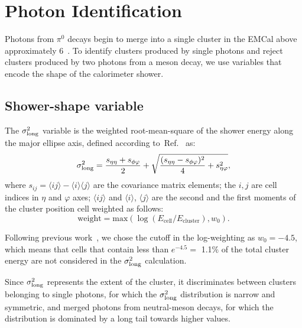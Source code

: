 
\section{Photon Identification}
\label{sec:photonID}
Photons from $\pi^0$ decays begin to merge into a single cluster in the EMCal above approximately  6~\GeVc. To identify clusters produced by single photons and reject clusters produced by two photons from a meson decay, we use variables that encode the shape of the calorimeter shower. %

\subsection{Shower-shape variable}
The $\sigma^{2}_{\mathrm{long}}$ variable is the weighted root-mean-square of the shower energy along the major ellipse axis, defined according to~Ref.~\cite{Abelev:2014ffa} as:
\begin{equation}
\sigma^{2}_{\mathrm{long}} = \frac{s_{\eta\eta}+ s_{\phi\varphi}}{2} + \sqrt{   \frac{(s_{\eta\eta} - s_{\phi\varphi})^{2}}{4} + s^{2}_{\eta\varphi}         },
\end{equation}
where $s_{ij} = \langle ij \rangle - \langle i \rangle\langle j \rangle$ are the covariance matrix elements; the $i,j$ are cell indices in $\eta$ and  $\varphi$ axes; $\langle ij \rangle$ and $\langle i\rangle$, $\langle j\rangle$ are the second and the first moments of the cluster position cell weighted as follows:
\begin{equation}
\mathrm{weight} = \mathrm{max}\left(\log(E_{\mathrm{cell}}/E_{\mathrm{cluster}}), w_{0}\right). 
\end{equation}

Following previous work~\cite{Acharya:2018dqe}, we chose the cutoff in the log-weighting as $w_{0}=-4.5$, which means that cells that contain less than {$e^{-4.5} =$ 1.1$\%$} of the total cluster energy are not considered in the $\sigma^{2}_{\mathrm{long}}$ calculation.

Since $\sigma^{2}_{\mathrm{long}}$ represents the extent of the cluster, it discriminates between clusters belonging to single photons, for which the $\sigma^{2}_{\mathrm{long}}$ distribution is narrow and symmetric, and merged photons from neutral-meson decays, for which the distribution is dominated by a long tail towards higher values. 

